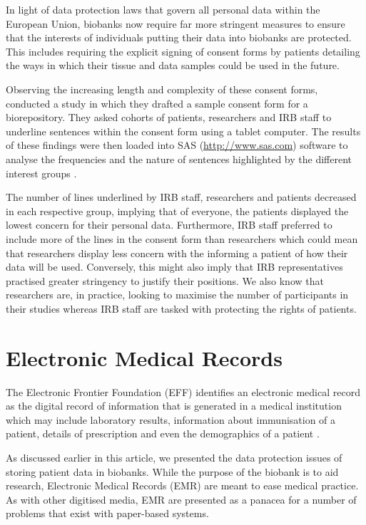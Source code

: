 \documentclass[british,a4paper, 12pt]{article}
\begin{document}
In light of data protection laws that govern all personal data within the European Union,
biobanks now require far more stringent measures to ensure that the interests of individuals
putting their data into biobanks are protected. This includes requiring the explicit signing of
consent forms by patients detailing the ways in which their tissue and data samples could
be used in the future.

Observing the increasing length and complexity of these consent forms,
\citeauthor*{beskow2010simplifyinog} conducted a study in which they drafted a sample consent form
for a biorepository. They asked cohorts of patients, researchers and IRB staff to underline
sentences within the consent form using a tablet computer. The results of these findings were
then loaded into SAS (\url{http://www.sas.com}) software to analyse the frequencies and the nature
of sentences highlighted by the different interest groups \parencite{beskow2010simplifyinog}.

The number of lines underlined by IRB staff, researchers and patients decreased in
each respective group, implying that of everyone, the patients displayed the lowest concern for
their personal data. Furthermore, IRB staff preferred to include more of the lines in the
consent form than researchers which could mean that researchers display less concern with the
informing a patient of how their data will be used. Conversely, this might also imply that IRB
representatives practised greater stringency to justify their positions. We also know that
researchers are, in practice, looking to maximise the number of participants in their studies
whereas IRB staff are tasked with protecting the rights of patients.

\section{Electronic Medical Records}
The Electronic Frontier Foundation (EFF) identifies an electronic medical record as
the digital record of information that is generated in a medical institution which may
include laboratory results, information about immunisation of a patient,
details of prescription and even the demographics of a patient
\parencite{effemrdefinition}.

As discussed earlier in this article, we presented the data protection issues of storing
patient data in biobanks. While the purpose of the biobank is to aid research, Electronic
Medical Records (EMR) are meant to ease medical practice. As with other digitised media,
EMR are presented as a panacea for a number of problems that exist with paper-based
systems.
\end{document}
